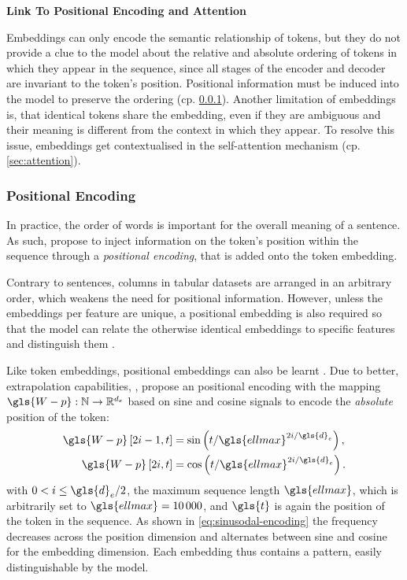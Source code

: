 \textbf{Link To Positional Encoding and Attention}

Embeddings can only encode the semantic relationship of tokens, but they do not provide a clue to the model about the relative and absolute ordering of tokens in which they appear in the sequence, since all stages of the encoder and decoder are invariant to the token's position. Positional information must be induced into the model to preserve the ordering (cp. \cref{sec:positional-encoding}). Another limitation of embeddings is, that identical tokens share the embedding, even if they are ambiguous and their meaning is different from the context in which they appear. To resolve this issue, embeddings get contextualised in the self-attention mechanism (cp. \cref{sec:attention}).

\subsubsection{Positional Encoding}\label{sec:positional-encoding}

In practice, the order of words is important for the overall meaning of a sentence. As such, \textcite[][6]{vaswaniAttentionAllYou2017} propose to inject information on the \gls{token}'s position within the sequence through a \emph{positional encoding}, that is added onto the \gls{token} embedding.

Contrary to sentences, columns in tabular datasets are arranged in an arbitrary order, which weakens the need for positional information. However, unless the embeddings per feature are unique, a positional embedding is also required so that the model can relate the otherwise identical embeddings to specific features and distinguish them \autocites[][3]{huangTabTransformerTabularData2020}[][15]{somepalliSaintImprovedNeural2021}.

Like \gls{token} embeddings, positional embeddings can also be learnt \autocite[cp.][4174]{devlinBERTPretrainingDeep2019}. Due to better, extrapolation capabilities, \textcite[][6]{vaswaniAttentionAllYou2017}, propose an positional encoding with the mapping $\gls{W-p}: \mathbb{N} \rightarrow \mathbb{R}^{d_{e}}$ based on sine and cosine signals to encode the \emph{absolute} position of the \gls{token}:
\begin{equation}
    \begin{aligned}
        \gls{W-p}\left[2 i-1, t\right] & =\sin \left(t / \gls{ellmax}^{2 i / \gls{d}_e}\right), \\
        \gls{W-p}\left[2 i, t\right]   & =\cos \left(t / \gls{ellmax}^{2 i / \gls{d}_e}\right).
    \end{aligned}
    \label{eq:sinusodal-encoding}
\end{equation}
with $0<i \leq \gls{d}_{e} / 2$, the maximum sequence length $\gls{ellmax}$, which is arbitrarily set to $\gls{ellmax}=\num{10000}$, and $\gls{t}$ is again the position of the \gls{token} in the sequence. As shown in \cref{eq:sinusodal-encoding} the frequency decreases across the position dimension and alternates between sine and cosine for the embedding dimension. Each embedding thus contains a pattern, easily distinguishable by the model.

